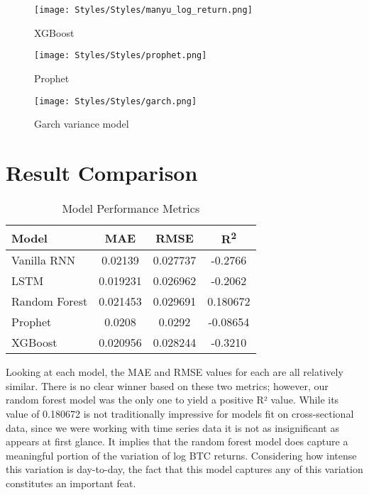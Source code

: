 \documentclass{article}
\begin{document}
\begin{figure}[H]
    \centering
    \texttt{[image: Styles/Styles/manyu\_log\_return.png]}
    \caption{XGBoost}
    \label{fig:enter-label}
\end{figure}

\begin{figure}
    \centering
    \texttt{[image: Styles/Styles/prophet.png]}
    \caption{Prophet}
    \label{fig:enter-label}
\end{figure}


\begin{figure}[H]
    \centering
    \texttt{[image: Styles/Styles/garch.png]}
    \caption{Garch variance model}
    \label{fig:enter-label}
\end{figure}

\newpage


\section{Result Comparison}
\begin{table}[H]
  \caption{Model Performance Metrics}
  \label{model-performance}
  \centering
  \begin{tabular}{lccc}
    \toprule
    Model & MAE & RMSE & R\textsuperscript{2} \\
    \midrule
    Vanilla RNN   & 0.02139  & 0.027737 & -0.2766   \\
    LSTM          & 0.019231 & 0.026962 & -0.2062   \\
    Random Forest & 0.021453 & 0.029691 & 0.180672  \\
    Prophet       & 0.0208   & 0.0292   & -0.08654  \\
    XGBoost       & 0.020956 & 0.028244 & -0.3210   \\
    \bottomrule
  \end{tabular}
\end{table}

Looking at each model, the MAE and RMSE values for each are all relatively similar. There is no clear winner based on these two metrics; however, our random forest model was the only one to yield a positive R² value. While its value of 0.180672 is not traditionally impressive for models fit on cross-sectional data, since we were working with time series data it is not as insignificant as appears at first glance. It implies that the random forest model does capture a meaningful portion of the variation of log BTC returns. Considering how intense this variation is day-to-day, the fact that this model captures any of this variation constitutes an important feat. \\
\end{document}
